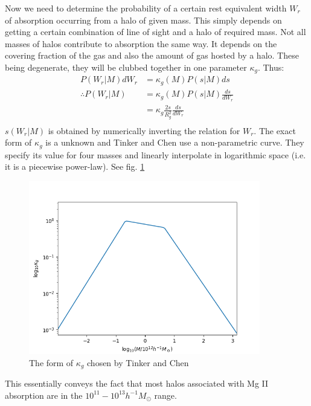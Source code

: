 \documentclass[12pt,a4paper,twoside]{book}
\begin{document}
		 	Now we need to determine the probability of a certain rest equivalent width $W_r$ of absorption occurring from a halo of given mass. This simply depends on getting a certain combination of line of sight and a halo of required mass. Not all masses of halos contribute to absorption the same way. It depends on the covering fraction of the gas and also the amount of gas hosted by a halo. These being degenerate, they will be clubbed together in one parameter $\kappa_g$. Thus:
		 	$$
		 	\begin{aligned}
			 	P(W_r|M)dW_r&=\kappa_g(M)P(s|M)ds\\
				\therefore P(W_r|M)&=\kappa_g(M)P(s|M)\frac{ds}{dW_r}\\
				&=\kappa_g\frac{2s}{R_g^2}\frac{ds}{dW_r}\\
		 	\end{aligned}
		 	$$
		 	$s(W_r|M)$ is obtained by numerically inverting the relation for $W_r$. The exact form of $\kappa_g$ is a unknown and Tinker and Chen use a non-parametric curve. They specify its value for four masses and linearly interpolate in logarithmic space (i.e. it is a piecewise power-law). See fig. \ref{fig:kappa_g}
		 	\begin{figure}
		 		\centering
		 		\includegraphics[width=0.9\textwidth]{kappa_g.png}
		 		\caption{The form of $\kappa_g$ chosen by Tinker and Chen}
		 		\label{fig:kappa_g}
		 	\end{figure}
		 	This essentially conveys the fact that most halos associated with Mg II absorption are in the $10^{11}-10^{13}h^{-1}M_\odot$ range.
\end{document}

